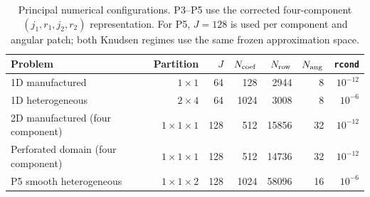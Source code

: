 \begin{table}[t]
\centering
\caption{Principal numerical configurations. P3--P5 use the corrected four-component $(j_1,r_1,j_2,r_2)$ representation. For P5, $J=128$ is used per component and angular patch; both Knudsen regimes use the same frozen approximation space.}
\label{tab:configurations}
\begin{tabular}{lrrrrrr}
\toprule
Problem & Partition & $J$ & $N_{\rm coef}$ & $N_{\rm row}$ & $N_{\rm ang}$ & \texttt{rcond}\\
\midrule
1D manufactured & $1\times1$ & 64 & 128 & 2944 & 8 & $10^{-12}$\\
1D heterogeneous & $2\times4$ & 64 & 1024 & 3008 & 8 & $10^{-6}$\\
2D manufactured (four component) & $1\times1\times1$ & 128 & 512 & 15856 & 32 & $10^{-12}$\\
Perforated domain (four component) & $1\times1\times1$ & 128 & 512 & 14736 & 32 & $10^{-12}$\\
P5 smooth heterogeneous & $1\times1\times2$ & 128 & 1024 & 58096 & 16 & $10^{-6}$\\
\bottomrule
\end{tabular}
\end{table}
